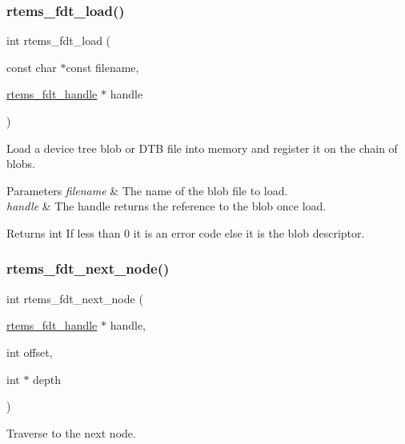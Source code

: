 \subsubsection{\texorpdfstring{rtems\_fdt\_load()}{rtems\_fdt\_load()}}
{\footnotesize\ttfamily int rtems\+\_\+fdt\+\_\+load (\begin{DoxyParamCaption}\item[{const char $\ast$const}]{filename,  }\item[{\mbox{\hyperlink{structrtems__fdt__handle}{rtems\+\_\+fdt\+\_\+handle}} $\ast$}]{handle }\end{DoxyParamCaption})}

Load a device tree blob or D\+TB file into memory and register it on the chain of blobs.


\begin{DoxyParams}{Parameters}
{\em filename} & The name of the blob file to load. \\
\hline
{\em handle} & The handle returns the reference to the blob once load. \\
\hline
\end{DoxyParams}
\begin{DoxyReturn}{Returns}
int If less than 0 it is an error code else it is the blob descriptor. 
\end{DoxyReturn}
\mbox{\label{rtems-fdt_8h_a20680319175c55fcc8f375730f2fc98e}} 
\subsubsection{\texorpdfstring{rtems\_fdt\_next\_node()}{rtems\_fdt\_next\_node()}}
{\footnotesize\ttfamily int rtems\+\_\+fdt\+\_\+next\+\_\+node (\begin{DoxyParamCaption}\item[{\mbox{\hyperlink{structrtems__fdt__handle}{rtems\+\_\+fdt\+\_\+handle}} $\ast$}]{handle,  }\item[{int}]{offset,  }\item[{int $\ast$}]{depth }\end{DoxyParamCaption})}

Traverse to the next node.


